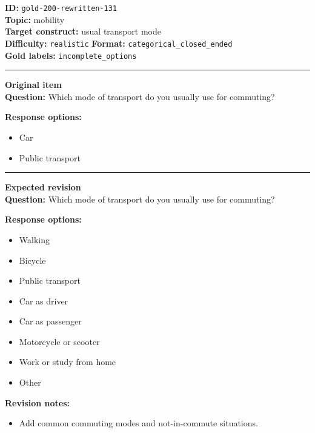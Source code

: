 \documentclass[10pt,a4paper]{article}
\newcommand{\sectionline}{\vspace{0.15em}\hrule\vspace{0.35em}}
\begin{document}
\begin{tcolorbox}[colframe=FlawRed,colback=white,colbacktitle=FlawRed!9,coltitle=black,title={Item 131\hfill Flawed item}]
\textbf{ID:} \texttt{gold-200-rewritten-131}\\
\textbf{Topic:} mobility\\
\textbf{Target construct:} usual transport mode\\
\textbf{Difficulty:} \texttt{realistic} \quad \textbf{Format:} \texttt{categorical\_closed\_ended}\\
\textbf{Gold labels:} \texttt{incomplete\_options}\\
\sectionline
\textbf{Original item}\\
\textbf{Question:} Which mode of transport do you usually use for commuting?
\par\textbf{Response options:}
\begin{itemize}
\item Car
\item Public transport
\end{itemize}
\sectionline
\textbf{Expected revision}\\
\textbf{Question:} Which mode of transport do you usually use for commuting?
\par\textbf{Response options:}
\begin{itemize}
\item Walking
\item Bicycle
\item Public transport
\item Car as driver
\item Car as passenger
\item Motorcycle or scooter
\item Work or study from home
\item Other
\end{itemize}
\par\textbf{Revision notes:}
\begin{itemize}
\item Add common commuting modes and not-in-commute situations.
\end{itemize}
\end{tcolorbox}
\end{document}
